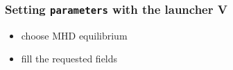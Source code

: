 \documentclass[10pt]{beamer}
\begin{document}
{
\begin{frame}[fragile]
  \frametitle{Setting {\tt parameters} with the launcher V}

\vspace{5.25cm}

\begin{block}{}
\begin{itemize}
\item choose MHD equilibrium
\item fill the requested fields
\end{itemize}
\end{block}

\end{frame}
}

\end{document}
